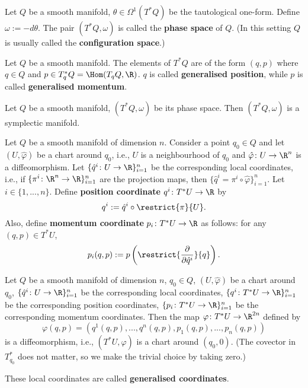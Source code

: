 \begin{definition}
  Let
    $Q$ be a smooth manifold,
    $\theta \in \Omega^1(T^* Q)$ be the tautological one-form.
  Define $\omega := - d \theta$.
  The pair $(T^* Q, \omega)$ is called the \textbf{phase space} of $Q$.
  (In this setting $Q$ is usually called the \textbf{configuration space}.)
\end{definition}
\begin{remark}
  Let $Q$ be a smooth manifold.
  The elements of $T^* Q$ are of the form $(q, p)$ where $q \in Q$ and
  $p \in T^*_q Q = \Hom(T_q Q, \R)$.
  $q$ is called \textbf{generalised position}, while $p$ is called
  \textbf{generalised momentum}.
\end{remark}
\begin{proposition}
  Let
    $Q$ be a smooth manifold,
    $(T^* Q, \omega)$ be its phase space.
  Then $(T^* Q, \omega)$ is a symplectic manifold.
\end{proposition}
\begin{definition}
  Let $Q$ be a smooth manifold of dimension $n$.
  Consider a point $q_0 \in Q$ and let $(U, \hat{\varphi})$ be a chart around
  $q_0$, i.e., $U$ is a neighbourhood of $q_0$ and
  $\hat{\varphi} \colon U \to \R^n$ is a diffeomorphism.
  Let $\{\hat{q}^i \colon U \to \R\}_{i = 1}^n$ be the corresponding local
  coordinates, i.e., if $\{\pi^i \colon \R^n \to \R\}_{i = 1}^n$ are the
  projection maps, then $\{\hat{q}^i = \pi^i \circ \hat{\varphi}\}_{i = 1}^n$.
  Let $i \in \{1, ..., n\}$.
  Define \textbf{position coordinate} $q^i \colon T^* U \to \R$ by
  \begin{equation}
    q^i := \hat{q}^i \circ \restrict{\pi}{U}.
  \end{equation}
  Also, define \textbf{momentum coordinate} $p_i \colon T^* U \to \R$
  as follows: for any $(q, p) \in T^* U$,
  \begin{equation}
    p_i(q, p)
    := p\left(\restrict{\frac{\partial}{\partial \hat{q}^i}}{q}\right).
  \end{equation}
\end{definition}
\begin{proposition}
  Let
    $Q$ be a smooth manifold of dimension $n$,
    $q_0 \in Q$,
    $(U, \hat{\varphi})$ be a chart around $q_0$,
    $\{\hat{q}^i \colon U \to \R\}_{i = 1}^n$ be the corresponding local
      coordinates,
    $\{q^i \colon T^* U \to \R\}_{i = 1}^n$ be the corresponding position
      coordinates,
    $\{p_i \colon T^* U \to \R\}_{i = 1}^n$ be the corresponding momentum
      coordinates.
  Then the map $\varphi \colon T^* U \to \R^{2 n}$ defined by
  \begin{equation}
    \varphi(q, p) = (q^1(q, p), ..., q^n(q, p), p_1(q, p), ..., p_n(q, p))
  \end{equation}
  is a diffeomorphism, i.e., $(T^* U, \varphi)$ is a chart around $(q_0, 0)$.
  (The covector in $T^*_{q_0}$ does not matter, so we make the trivial choice by
  taking zero.)

  These local coordinates are called \textbf{generalised coordinates}.
\end{proposition}
